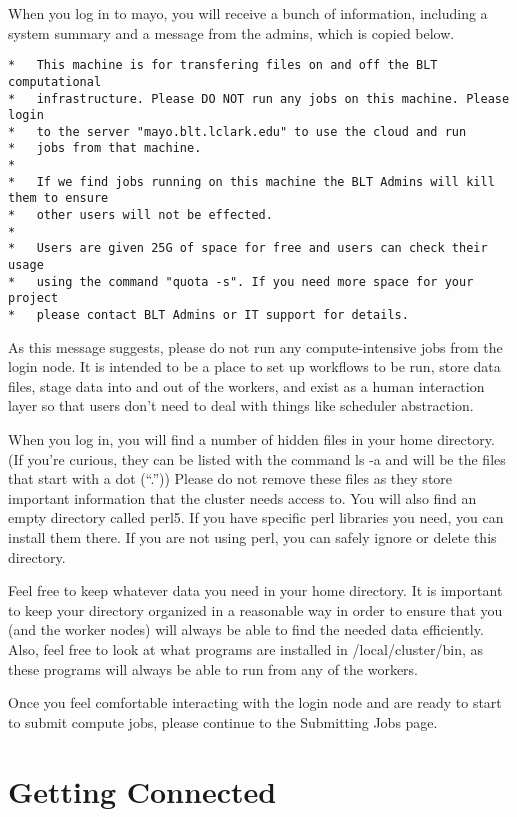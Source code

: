 \documentclass[]{book}
\theoremstyle{definition}
\theoremstyle{definition}
\theoremstyle{definition}
\theoremstyle{remark}
\begin{document}
When you log in to mayo, you will receive a bunch of information,
including a system summary and a message from the admins, which is
copied below.

\begin{verbatim}
*   This machine is for transfering files on and off the BLT computational
*   infrastructure. Please DO NOT run any jobs on this machine. Please login 
*   to the server "mayo.blt.lclark.edu" to use the cloud and run
*   jobs from that machine. 
*
*   If we find jobs running on this machine the BLT Admins will kill them to ensure
*   other users will not be effected.
*
*   Users are given 25G of space for free and users can check their usage
*   using the command "quota -s". If you need more space for your project
*   please contact BLT Admins or IT support for details.
\end{verbatim}

As this message suggests, please do not run any compute-intensive jobs
from the login node. It is intended to be a place to set up workflows to
be run, store data files, stage data into and out of the workers, and
exist as a human interaction layer so that users don't need to deal with
things like scheduler abstraction.

When you log in, you will find a number of hidden files in your home
directory. (If you're curious, they can be listed with the command ls -a
and will be the files that start with a dot (``.'')) Please do not
remove these files as they store important information that the cluster
needs access to. You will also find an empty directory called perl5. If
you have specific perl libraries you need, you can install them there.
If you are not using perl, you can safely ignore or delete this
directory.

Feel free to keep whatever data you need in your home directory. It is
important to keep your directory organized in a reasonable way in order
to ensure that you (and the worker nodes) will always be able to find
the needed data efficiently. Also, feel free to look at what programs
are installed in /local/cluster/bin, as these programs will always be
able to run from any of the workers.

Once you feel comfortable interacting with the login node and are ready
to start to submit compute jobs, please continue to the Submitting Jobs
page.

\chapter{Getting Connected}\label{getting-connected}
\end{document}
